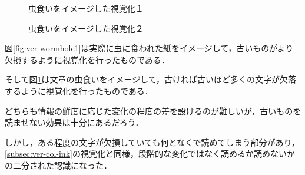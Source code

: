 \begin{figure}[htbp]
  \begin{minipage}{0.5\hsize}
    \begin{center}
    \end{center}
    \caption{虫食いをイメージした視覚化１}
    \label{fig:ver-wormhole1}
  \end{minipage}
  \begin{minipage}{0.5\hsize}
    \begin{center}
    \end{center}
    \caption{虫食いをイメージした視覚化２}
    \label{fig:ver-wormhole2}
  \end{minipage}
\end{figure}

図\ref{fig:ver-wormhole1}は実際に虫に食われた紙をイメージして，古いものがより欠損するように視覚化を行ったものである．

そして図\ref{fig:ver-wormhole2}は文章の虫食いをイメージして，古ければ古いほど多くの文字が欠落するように視覚化を行ったものである．

どちらも情報の鮮度に応じた変化の程度の差を設けるのが難しいが，古いものを読ませない効果は十分にあるだろう．

しかし，ある程度の文字が欠損していても何となくで読めてしまう部分があり，\ref{subsec:ver-col-ink}の視覚化と同様，段階的な変化ではなく読めるか読めないかの二分された認識になった．

